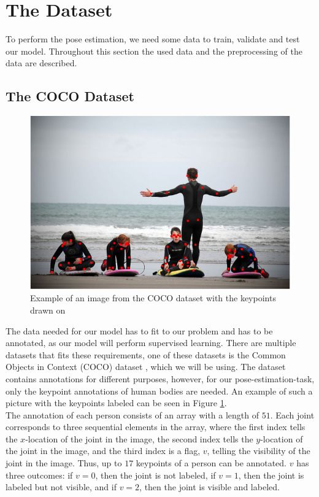 \documentclass[main.tex]{subfiles}
\begin{document}
\section{The Dataset}
To perform the pose estimation, we need some data to train, validate and test our model. Throughout this section the used data and the preprocessing of the data are described.

\subsection{The COCO Dataset}
\begin{figure}[H]
    \centering
    \includegraphics[height = 4 cm]{./entities/coco_example.png}
    \caption{Example of an image from the COCO dataset with the keypoints drawn on \cite{COCO_article}}
    \label{fig:coco_example}
\end{figure}
The data needed for our model has to fit to our problem and has to be annotated, as our model will perform supervised learning. There are multiple datasets that fits these requirements, one of these datasets is the Common Objects in Context (COCO) dataset \cite{COCO_article}, which we will be using. The dataset contains annotations for different purposes, however, for our pose-estimation-task, only the keypoint annotations of human bodies are needed. An example of such a picture with the keypoints labeled can be seen in Figure \ref{fig:coco_example}. \\
The annotation of each person consists of an array with a length of $51$. Each joint corresponds to three sequential elements in the array, where the first index tells the $x$-location of the joint in the image, the second index tells the $y$-location of the joint in the image, and the third index is a flag, $v$, telling the visibility of the joint in the image. Thus, up to $17$ keypoints of a person can be annotated. $v$ has three outcomes: if $v = 0$, then the joint is not labeled, if $v = 1$, then the joint is labeled but not visible, and if $v = 2$, then the joint is visible and labeled. \\
\end{document}
